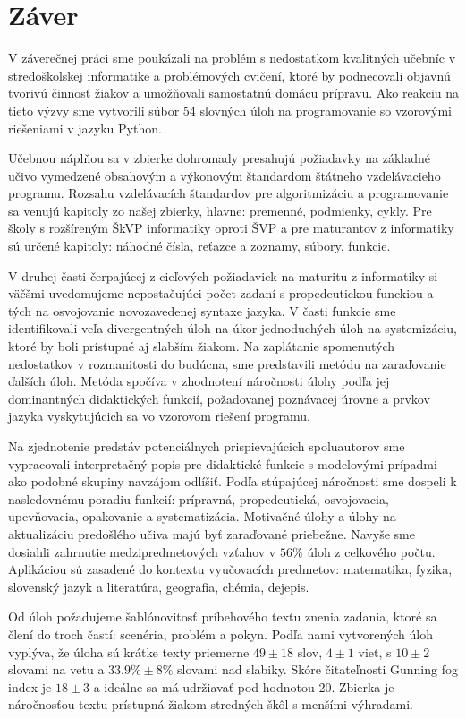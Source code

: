 \chapter{Záver}
V záverečnej práci sme poukázali na problém s nedostatkom kvalitných učebníc v stredoškolskej informatike a problémových cvičení, ktoré by podnecovali objavnú tvorivú činnosť žiakov a umožňovali samostatnú domácu prípravu. Ako reakciu na tieto výzvy sme vytvorili súbor 54 slovných úloh na programovanie so vzorovými riešeniami v jazyku Python.

Učebnou náplňou sa v zbierke dohromady presahujú požiadavky na základné učivo vymedzené obsahovým a výkonovým štandardom štátneho vzdelávacieho programu. Rozsahu vzdelávacích štandardov pre algoritmizáciu a programovanie sa venujú kapitoly zo našej zbierky, hlavne: premenné, podmienky, cykly. Pre školy s rozšíreným ŠkVP informatiky oproti ŠVP a pre maturantov z informatiky sú určené kapitoly: náhodné čísla, reťazce a zoznamy, súbory, funkcie.

V druhej časti čerpajúcej z cieľových požiadaviek na maturitu z informatiky si väčšmi uvedomujeme nepostačujúci počet zadaní s propedeutickou funckiou a tých na osvojovanie novozavedenej syntaxe jazyka. V časti funkcie sme identifikovali veľa divergentných úloh na úkor jednoduchých úloh na systemizáciu, ktoré by boli prístupné aj slabším žiakom. Na zaplátanie spomenutých nedostatkov v rozmanitosti do budúcna, sme predstavili metódu na zaraďovanie ďalších úloh. Metóda spočíva v zhodnotení náročnosti úlohy podľa jej dominantných didaktických funkcií, požadovanej poznávacej úrovne a prvkov jazyka vyskytujúcich sa vo vzorovom riešení programu.

Na zjednotenie predstáv potenciálnych prispievajúcich spoluautorov sme vypracovali interpretačný popis pre didaktické funkcie s modelovými prípadmi ako podobné skupiny navzájom odlíšiť. Podľa stúpajúcej náročnosti sme dospeli k nasledovnému poradiu funkcií: prípravná, propedeutická, osvojovacia, upevňovacia, opakovanie a systematizácia. Motivačné úlohy a úlohy na aktualizáciu predošlého učiva majú byť zaraďované priebežne. Navyše sme dosiahli zahrnutie medzipredmetových vzťahov v $56 \%$ úloh z celkového počtu. Aplikáciou sú zasadené do kontextu vyučovacích predmetov: matematika, fyzika, slovenský jazyk a literatúra, geografia, chémia, dejepis.

Od úloh požadujeme šablónovitosť príbehového textu znenia zadania, ktoré sa člení do troch častí: scenéria, problém a pokyn. Podľa nami vytvorených úloh vyplýva, že úloha sú krátke texty priemerne $49 \pm 18$ slov, $4 \pm 1$ viet, s $10 \pm 2$ slovami na vetu a $33.9\% \pm 8\%$ slovami nad slabiky. Skóre čitateľnosti Gunning fog index je $18 \pm 3$ a ideálne sa má udržiavať pod hodnotou 20. Zbierka je náročnosťou textu prístupná žiakom stredných škôl s menšími výhradami.

